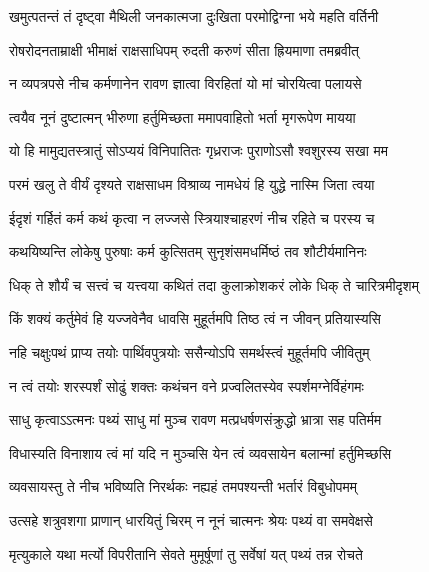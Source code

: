 
\twolineshloka
{खमुत्पतन्तं तं दृष्ट्वा मैथिली जनकात्मजा}
{दुःखिता परमोद्विग्ना भये महति वर्तिनी} %

\twolineshloka
{रोषरोदनताम्राक्षी भीमाक्षं राक्षसाधिपम्}
{रुदती करुणं सीता ह्रियमाणा तमब्रवीत्} %

\twolineshloka
{न व्यपत्रपसे नीच कर्मणानेन रावण}
{ज्ञात्वा विरहितां यो मां चोरयित्वा पलायसे} %

\twolineshloka
{त्वयैव नूनं दुष्टात्मन् भीरुणा हर्तुमिच्छता}
{ममापवाहितो भर्ता मृगरूपेण मायया} %

\twolineshloka
{यो हि मामुद्यतस्त्रातुं सोऽप्ययं विनिपातितः}
{गृध्रराजः पुराणोऽसौ श्वशुरस्य सखा मम} %

\twolineshloka
{परमं खलु ते वीर्यं दृश्यते राक्षसाधम}
{विश्राव्य नामधेयं हि युद्धे नास्मि जिता त्वया} %

\twolineshloka
{ईदृशं गर्हितं कर्म कथं कृत्वा न लज्जसे}
{स्त्रियाश्चाहरणं नीच रहिते च परस्य च} %

\twolineshloka
{कथयिष्यन्ति लोकेषु पुरुषाः कर्म कुत्सितम्}
{सुनृशंसमधर्मिष्ठं तव शौटीर्यमानिनः} %

\twolineshloka
{धिक् ते शौर्यं च सत्त्वं च यत्त्वया कथितं तदा}
{कुलाक्रोशकरं लोके धिक् ते चारित्रमीदृशम्} %

\twolineshloka
{किं शक्यं कर्तुमेवं हि यज्जवेनैव धावसि}
{मुहूर्तमपि तिष्ठ त्वं न जीवन् प्रतियास्यसि} %

\twolineshloka
{नहि चक्षुःपथं प्राप्य तयोः पार्थिवपुत्रयोः}
{ससैन्योऽपि समर्थस्त्वं मुहूर्तमपि जीवितुम्} %

\twolineshloka
{न त्वं तयोः शरस्पर्शं सोढुं शक्तः कथंचन}
{वने प्रज्वलितस्येव स्पर्शमग्नेर्विहंगमः} %

\twolineshloka
{साधु कृत्वाऽऽत्मनः पथ्यं साधु मां मुञ्च रावण}
{मत्प्रधर्षणसंक्रुद्धो भ्रात्रा सह पतिर्मम} %

\twolineshloka
{विधास्यति विनाशाय त्वं मां यदि न मुञ्चसि}
{येन त्वं व्यवसायेन बलान्मां हर्तुमिच्छसि} %

\twolineshloka
{व्यवसायस्तु ते नीच भविष्यति निरर्थकः}
{नह्यहं तमपश्यन्ती भर्तारं विबुधोपमम्} %

\twolineshloka
{उत्सहे शत्रुवशगा प्राणान् धारयितुं चिरम्}
{न नूनं चात्मनः श्रेयः पथ्यं वा समवेक्षसे} %

\twolineshloka
{मृत्युकाले यथा मर्त्यो विपरीतानि सेवते}
{मुमूर्षूणां तु सर्वेषां यत् पथ्यं तन्न रोचते} %


